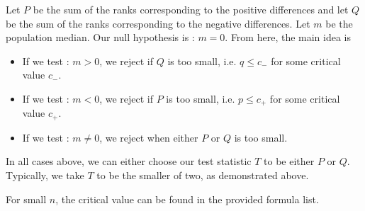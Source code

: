 Let $P$ be the sum of the ranks corresponding to the positive differences and let $Q$ be the sum of the ranks corresponding to the negative differences. Let $m$ be the population median. Our null hypothesis is \nullhyp: $m = 0$. From here, the main idea is
\begin{itemize}
    \item If we test \althyp: $m > 0$, we reject \nullhyp{} if $Q$ is too small, i.e. $q \leq c_-$ for some critical value $c_-$.
    \item If we test \althyp: $m < 0$, we reject \nullhyp{} if $P$ is too small, i.e. $p \leq c_+$ for some critical value $c_+$.
    \item If we test \althyp: $m \neq 0$, we reject \nullhyp{} when either $P$ or $Q$ is too small.
\end{itemize}

In all cases above, we can either choose our test statistic $T$ to be either $P$ or $Q$. Typically, we take $T$ to be the smaller of two, as demonstrated above.

For small $n$, the critical value can be found in the provided formula list.

